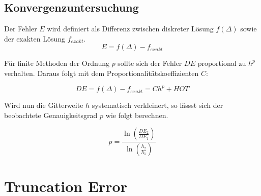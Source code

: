 \documentclass[10pt, ngerman,colorback,accentcolor=tud2d]{tudreport}
\begin{document}
\section{Konvergenzuntersuchung}
\label{sec:Konvergenzuntersuchung}

Der Fehler $E$ wird definiert als Differenz zwischen diskreter Lösung $f(\Delta)$ sowie
der exakten Lösung $f_{exakt}$.
\begin{equation*}
  E=f(\Delta) - f_{exakt}
\end{equation*}

Für finite Methoden der Ordnung $p$ sollte sich der Fehler $DE$ proportional zu
$h^p$ verhalten. Daraus folgt mit dem Proportionalitätskoeffizienten $C$:

\begin{equation*}
  DE=f(\Delta) - f_{exakt}=C h^p + HOT
\end{equation*}

Wird nun die Gitterweite $h$ systematisch verkleinert, so lässst sich der beobachtete
Genauigkeitsgrad $p$ wie folgt berechnen.

\begin{equation}
  p=\frac{\ln \left(\frac{DE_2}{DE_1}\right)}{\ln \left(\frac{h_2}{h_1}\right)}
\end{equation}



\chapter{Truncation Error}
\label{cha:Truncation Error}

\newcommand{\ab}{\frac{a+b}{2}}
\newcommand{\abk}{\left(\frac{a+b}{2}\right)}
\end{document}
